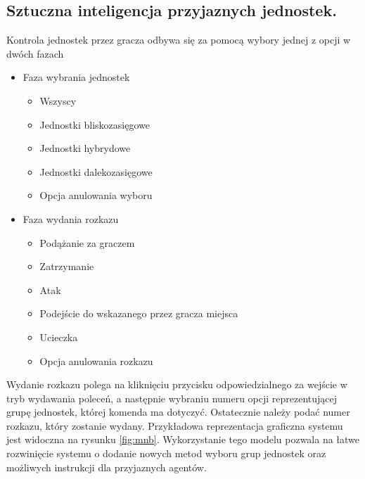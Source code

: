 \subsection{Sztuczna inteligencja przyjaznych jednostek.}

Kontrola jednostek przez gracza odbywa się za pomocą wybory jednej z opcji w dwóch fazach
\begin{itemize}
\item Faza wybrania jednostek
  \begin{itemize}
    \item Wszyscy
    \item Jednostki bliskozasięgowe 
    \item Jednostki hybrydowe
    \item Jednostki dalekozasięgowe
    \item Opcja anulowania wyboru
  \end{itemize}

\item Faza wydania rozkazu
  \begin{itemize}
    \item Podążanie za graczem
    \item Zatrzymanie
    \item Atak
    \item Podejście do wskazanego przez gracza miejsca
    \item Ucieczka
      \item Opcja anulowania rozkazu
  \end{itemize}
\end{itemize}
Wydanie rozkazu polega na kliknięciu przycisku odpowiedzialnego za wejście w tryb wydawania poleceń, a następnie
wybraniu numeru opcji reprezentującej grupę jednostek, której komenda ma dotyczyć. Ostatecznie należy podać numer rozkazu, który zostanie wydany.
Przykładowa reprezentacja graficzna systemu jest widoczna na rysunku \ref{fig:mnb}.
Wykorzystanie tego modelu pozwala na łatwe rozwinięcie systemu o dodanie nowych metod wyboru grup jednostek oraz możliwych instrukcji dla przyjaznych agentów.
